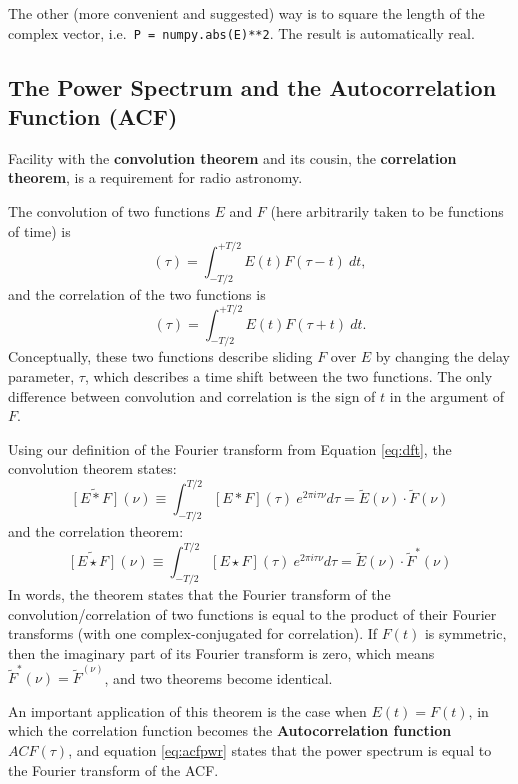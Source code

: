 \documentclass[11pt,preprint]{aastex}
\begin{document}
The other (more convenient and suggested) way is to square the length of
the complex vector, i.e.\ \verb$P = numpy.abs(E)**2$. The result is
automatically real.


\subsection{The Power Spectrum and the Autocorrelation Function
  (ACF)} \label{acf}

\noindent
Facility with the {\bf convolution theorem} and its cousin,
the {\bf correlation theorem}, 
is a requirement for radio astronomy. 

The convolution of two functions $E$ and $F$ (here arbitrarily taken
to be functions of time) is
%
\begin{equation}
[E * F](\tau) = \int_{-T/2}^{+T/2} E(t) F(\tau - t) \ dt,
\end{equation}
%
and the correlation of the two functions is
%
\begin{equation}
[E\star F](\tau) = \int_{-T/2}^{+T/2} E(t) F(\tau + t) \ dt.
\end{equation}
%
\noindent Conceptually, these two functions describe sliding $F$ over
$E$ by changing the delay parameter, $\tau$, which describes a
time shift between the two functions.
The only difference between convolution and correlation is the sign of $t$ in the argument of
$F$.

Using our definition of the Fourier transform from
Equation \ref{eq:dft}, the convolution theorem states:
%
\begin{equation}
\widetilde{[E*F]}(\nu)\equiv\int_{-T/2}^{T/2} [E*F](\tau)~e^{2\pi i \tau\nu} d\tau =
    \tilde E(\nu) \cdot \tilde F(\nu)
\end{equation}
%
and the correlation theorem:
\begin{equation}
\widetilde{[E\star F]}(\nu)\equiv\int_{-T/2}^{T/2} [E\star F](\tau)~e^{2\pi i \tau\nu} d\tau =
    \tilde E(\nu) \cdot \tilde F^*(\nu)
\label{eq:acfpwr}
\end{equation}
%
In words, the theorem states that the Fourier transform of
  the convolution/correlation of two functions is equal to the product of their
  Fourier transforms (with one complex-conjugated for correlation).
If $F(t)$ is
symmetric, then the imaginary part of its Fourier transform is zero,
which means $\tilde F^*(\nu) = \tilde F^(\nu)$, and two theorems become
identical.

An important application of this theorem is the case when
$E(t)=F(t)$, in which the correlation function becomes the {\bf
  Autocorrelation function} $ACF(\tau)$, and equation \ref{eq:acfpwr}
states that the power spectrum is equal to the Fourier
  transform of the ACF.
\end{document}
